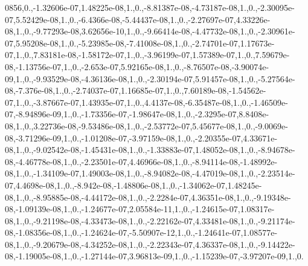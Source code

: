 \begin{DoxyCompactItemize}
0856,0.,-\/1.\-32606e-\/07,1.\-48225e-\/08,1.,0.,-\/8.\-81387e-\/08,-\/4.\-73187e-\/08,1.,0.,-\/2.\-30095e-\/07,5.\-52429e-\/08,1.,0.,-\/6.\-4366e-\/08,-\/5.\-44437e-\/08,1.,0.,-\/2.\-27697e-\/07,4.\-33226e-\/08,1.,0.,-\/9.\-77293e-\/08,3.\-62656e-\/10,1.,0.,-\/9.\-66414e-\/08,-\/4.\-47732e-\/08,1.,0.,-\/2.\-30961e-\/07,5.\-95208e-\/08,1.,0.,-\/5.\-23985e-\/08,-\/7.\-41008e-\/08,1.,0.,-\/2.\-74701e-\/07,1.\-17673e-\/07,1.,0.,7.\-83181e-\/08,-\/1.\-58172e-\/07,1.,0.,-\/3.\-96199e-\/07,1.\-57389e-\/07,1.,0.,7.\-59679e-\/08,-\/1.\-13756e-\/07,1.,0.,-\/2.\-653e-\/07,5.\-92165e-\/08,1.,0.,-\/8.\-76507e-\/08,-\/3.\-90074e-\/09,1.,0.,-\/9.\-93529e-\/08,-\/4.\-36136e-\/08,1.,0.,-\/2.\-30194e-\/07,5.\-91457e-\/08,1.,0.,-\/5.\-27564e-\/08,-\/7.\-376e-\/08,1.,0.,-\/2.\-74037e-\/07,1.\-16685e-\/07,1.,0.,7.\-60189e-\/08,-\/1.\-54562e-\/07,1.,0.,-\/3.\-87667e-\/07,1.\-43935e-\/07,1.,0.,4.\-4137e-\/08,-\/6.\-35487e-\/08,1.,0.,-\/1.\-46509e-\/07,-\/8.\-94896e-\/09,1.,0.,-\/1.\-73356e-\/07,-\/1.\-98647e-\/08,1.,0.,-\/2.\-3295e-\/07,8.\-8408e-\/08,1.,0.,3.\-22736e-\/08,-\/9.\-53486e-\/08,1.,0.,-\/2.\-53772e-\/07,5.\-45677e-\/08,1.,0.,-\/9.\-0069e-\/08,-\/3.\-71296e-\/09,1.,0.,-\/1.\-01208e-\/07,-\/3.\-97159e-\/08,1.,0.,-\/2.\-20355e-\/07,4.\-33671e-\/08,1.,0.,-\/9.\-02542e-\/08,-\/1.\-45431e-\/08,1.,0.,-\/1.\-33883e-\/07,1.\-48052e-\/08,1.,0.,-\/8.\-94678e-\/08,-\/4.\-46778e-\/08,1.,0.,-\/2.\-23501e-\/07,4.\-46966e-\/08,1.,0.,-\/8.\-94114e-\/08,-\/1.\-48992e-\/08,1.,0.,-\/1.\-34109e-\/07,1.\-49003e-\/08,1.,0.,-\/8.\-94082e-\/08,-\/4.\-47019e-\/08,1.,0.,-\/2.\-23514e-\/07,4.\-4698e-\/08,1.,0.,-\/8.\-942e-\/08,-\/1.\-48806e-\/08,1.,0.,-\/1.\-34062e-\/07,1.\-48245e-\/08,1.,0.,-\/8.\-95885e-\/08,-\/4.\-44172e-\/08,1.,0.,-\/2.\-2284e-\/07,4.\-36351e-\/08,1.,0.,-\/9.\-19348e-\/08,-\/1.\-09139e-\/08,1.,0.,-\/1.\-24677e-\/07,2.\-05584e-\/11,1.,0.,-\/1.\-24615e-\/07,1.\-08317e-\/08,1.,0.,-\/9.\-21198e-\/08,-\/4.\-33473e-\/08,1.,0.,-\/2.\-22162e-\/07,4.\-33481e-\/08,1.,0.,-\/9.\-21174e-\/08,-\/1.\-08356e-\/08,1.,0.,-\/1.\-24624e-\/07,-\/5.\-50907e-\/12,1.,0.,-\/1.\-24641e-\/07,1.\-08577e-\/08,1.,0.,-\/9.\-20679e-\/08,-\/4.\-34252e-\/08,1.,0.,-\/2.\-22343e-\/07,4.\-36337e-\/08,1.,0.,-\/9.\-14422e-\/08,-\/1.\-19005e-\/08,1.,0.,-\/1.\-27144e-\/07,3.\-96813e-\/09,1.,0.,-\/1.\-15239e-\/07,-\/3.\-97207e-\/09,1.,0.
\end{DoxyCompactItemize}
